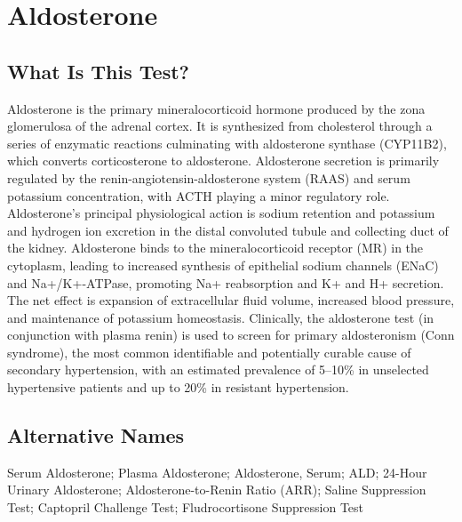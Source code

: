 \chapter{Aldosterone}

\section*{What Is This Test?}
Aldosterone is the primary mineralocorticoid hormone produced by the zona glomerulosa of the adrenal cortex. It is synthesized from cholesterol through a series of enzymatic reactions culminating with aldosterone synthase (CYP11B2), which converts corticosterone to aldosterone. Aldosterone secretion is primarily regulated by the renin-angiotensin-aldosterone system (RAAS) and serum potassium concentration, with ACTH playing a minor regulatory role. Aldosterone's principal physiological action is sodium retention and potassium and hydrogen ion excretion in the distal convoluted tubule and collecting duct of the kidney. Aldosterone binds to the mineralocorticoid receptor (MR) in the cytoplasm, leading to increased synthesis of epithelial sodium channels (ENaC) and Na+/K+-ATPase, promoting Na+ reabsorption and K+ and H+ secretion. The net effect is expansion of extracellular fluid volume, increased blood pressure, and maintenance of potassium homeostasis. Clinically, the aldosterone test (in conjunction with plasma renin) is used to screen for primary aldosteronism (Conn syndrome), the most common identifiable and potentially curable cause of secondary hypertension, with an estimated prevalence of 5--10\% in unselected hypertensive patients and up to 20\% in resistant hypertension.

\section*{Alternative Names}
Serum Aldosterone; Plasma Aldosterone; Aldosterone, Serum; ALD; 24-Hour Urinary Aldosterone; Aldosterone-to-Renin Ratio (ARR); Saline Suppression Test; Captopril Challenge Test; Fludrocortisone Suppression Test

